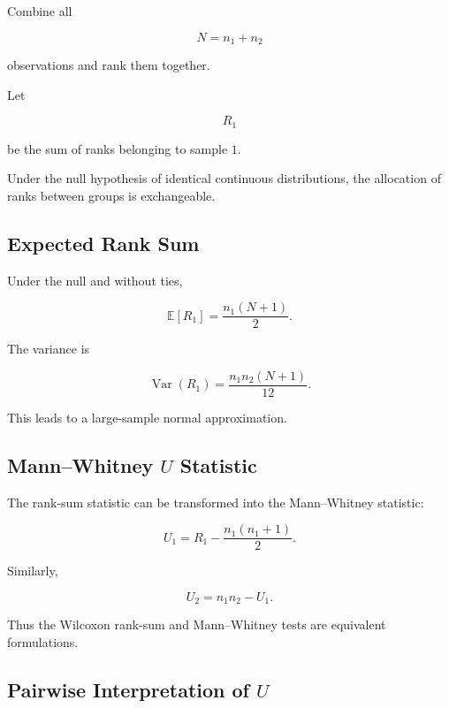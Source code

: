 Combine all

\[
N=n_1+n_2
\]

observations and rank them together.

Let

\[
R_1
\]

be the sum of ranks belonging to sample \(1\).

Under the null hypothesis of identical continuous distributions, the
allocation of ranks between groups is exchangeable.

\subsection{Expected Rank Sum}
\label{subsec:expected-rank-sum}

Under the null and without ties,

\[
\boxed{
\mathbb{E}[R_1]
=
\frac{
n_1(N+1)
}{2}.
}
\]

The variance is

\[
\boxed{
\operatorname{Var}(R_1)
=
\frac{
n_1n_2(N+1)
}{
12
}.
}
\]

This leads to a large-sample normal approximation.

\subsection{Mann--Whitney \(U\) Statistic}
\label{subsec:mann-whitney-u}

The rank-sum statistic can be transformed into the Mann--Whitney
statistic:

\[
\boxed{
U_1
=
R_1
-
\frac{
n_1(n_1+1)
}{2}.
}
\]

Similarly,

\[
\boxed{
U_2
=
n_1n_2-U_1.
}
\]

Thus the Wilcoxon rank-sum and Mann--Whitney tests are equivalent
formulations.

\subsection{Pairwise Interpretation of \(U\)}
\label{subsec:mann-whitney-pairwise}

